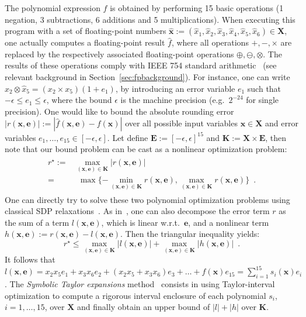 \documentclass[preprint]{sigplanconf}
\newcommand{\x}{\mathbf{x}}
\newcommand{\e}{\mathbf{e}}
\def\E{\mathbf{E}}
\def\K{\mathbf{K}}
\def\X{\mathbf{X}}
\theoremstyle{plain}
\begin{document}
The polynomial expression $f$ is obtained by performing 15 basic operations (1 negation, 3 subtractions, 6 additions and 5 multiplications). 
When executing this program with a set of floating-point numbers $\hat{\x} :=  (\hat{x}_1, \hat{x}_2, \hat{x}_3, \hat{x}_4, \hat{x}_5, \hat{x}_6) \in \X$, one actually computes a floating-point result $\hat{f}$, where all operations $+, -, \times$ are replaced by the respectively associated floating-point operations $\oplus, \ominus, \otimes$. 
The results of these operations comply with IEEE 754 standard arithmetic~\cite{IEEE} (see relevant background in Section~\ref{sec:fpbackground}). For instance, one can write $\hat{x}_2 \otimes \hat{x}_5 =  (x_2 \times x_5) (1 + e_1)$, by introducing an error variable $e_1$ such that $-\epsilon \leq e_1 \leq \epsilon$, where the bound $\epsilon$ is the machine precision (e.g.~$2^{-24}$ for single precision). One would like to bound the absolute rounding error $|r(\x, \e)| := | \hat{f}(\x, \e) - f (\x) |$ over  all possible input variables $\x \in \X$ and error variables $e_1, \dots, e_{15} \in [-\epsilon, \epsilon]$. Let define $\E := [-\epsilon, \epsilon]^{15}$ and $\K := \X \times \E$, then note that our bound problem can be cast as a nonlinear optimization problem:
%
\begin{align}
\begin{split}
\label{eq:roptim}
r^\star := & \max_{(\x, \e) \in \K} | r(\x, \e) | \\
 = & \ \ \max \{-\min_{(\x, \e) \in \K} r(\x, \e), \max_{(\x, \e) \in \K} r(\x,\e)\} \enspace. 
\end{split}
\end{align}
%
One can directly try to solve these two polynomial optimization problems using classical SDP relaxations~\cite{Lasserre01moments}.
As in~\cite{fptaylor15}, one can also decompose the error term $r$ as the sum of a term $l(\x,\e)$, which is linear w.r.t.~$\e$, and a nonlinear term $h(\x,\e) := r(\x,\e) - l(\x,\e)$. Then the triangular inequality yields:
%
\begin{equation}
\label{eq:lhoptim} 
r^\star \leq \max_{(\x, \e) \in \K} |l(\x, \e)| + \max_{(\x, \e) \in \K} |h(\x, \e)| \enspace. 
\end{equation}
%
It follows that $l(\x,\e) = x_2 x_5 e_1 + x_3 x_6 e_2 +  (x_2 x_5 + x_3 x_6) e_3 + \dots + f(\x) e_{15} = \sum_{i=1}^{15} s_i(\x) e_i$. The {\em Symbolic Taylor expansions} method~\cite{fptaylor15} consists in using Taylor-interval optimization to compute a rigorous interval enclosure of each polynomial $s_i$, $i = 1,\dots,15$, over $\X$ and finally obtain an upper bound of $|l| + |h|$ over $\K$.
\end{document}
